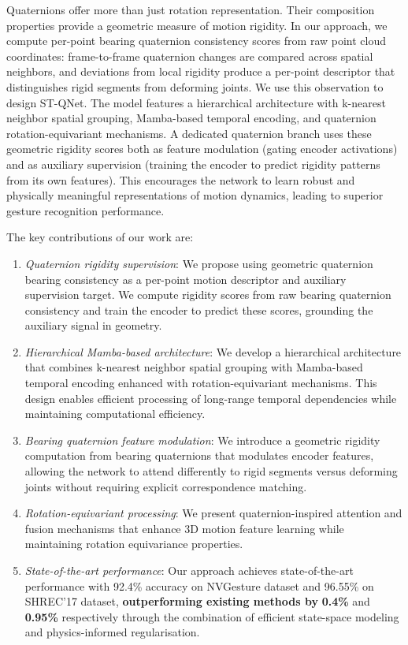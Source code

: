 \documentclass[journal]{IEEEtran}
\theoremstyle{plain}
\begin{document}
Quaternions offer more than just rotation representation. Their composition properties provide a geometric measure of motion rigidity. In our approach, we compute per-point bearing quaternion consistency scores from raw point cloud coordinates: frame-to-frame quaternion changes are compared across spatial neighbors, and deviations from local rigidity produce a per-point descriptor that distinguishes rigid segments from deforming joints. We use this observation to design ST-QNet. The model features a hierarchical architecture with k-nearest neighbor spatial grouping, Mamba-based temporal encoding, and quaternion rotation-equivariant mechanisms. A dedicated quaternion branch uses these geometric rigidity scores both as feature modulation (gating encoder activations) and as auxiliary supervision (training the encoder to predict rigidity patterns from its own features). This encourages the network to learn robust and physically meaningful representations of motion dynamics, leading to superior gesture recognition performance.

The key contributions of our work are:
\begin{enumerate}
    \item \textit{Quaternion rigidity supervision}: We propose using geometric quaternion bearing consistency as a per-point motion descriptor and auxiliary supervision target. We compute rigidity scores from raw bearing quaternion consistency and train the encoder to predict these scores, grounding the auxiliary signal in geometry.

    \item \textit{Hierarchical Mamba-based architecture}: We develop a hierarchical architecture that combines k-nearest neighbor spatial grouping with Mamba-based temporal encoding enhanced with rotation-equivariant mechanisms. This design enables efficient processing of long-range temporal dependencies while maintaining computational efficiency.

    \item \textit{Bearing quaternion feature modulation}: We introduce a geometric rigidity computation from bearing quaternions that modulates encoder features, allowing the network to attend differently to rigid segments versus deforming joints without requiring explicit correspondence matching.

    \item \textit{Rotation-equivariant processing}: We present quaternion-inspired attention and fusion mechanisms that enhance 3D motion feature learning while maintaining rotation equivariance properties.

    \item \textit{State-of-the-art performance}: Our approach achieves state-of-the-art performance with 92.4\% accuracy on NVGesture dataset and 96.55\% on SHREC'17 dataset, \textbf{outperforming existing methods by }\textbf{0.4\%} and \textbf{0.95\%} respectively through the combination of efficient state-space modeling and physics-informed regularisation.
\end{enumerate}
\end{document}
